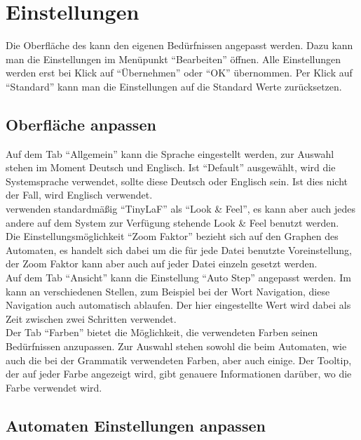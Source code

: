 \chapter{Einstellungen}

Die Oberfläche des \gtitools kann den eigenen Bedürfnissen angepasst werden.
Dazu kann man die Einstellungen im Menüpunkt "`Bearbeiten"' öffnen. Alle
Einstellungen werden erst bei Klick auf "`Übernehmen"' oder "`OK"' übernommen.
Per Klick auf "`Standard"' kann man die Einstellungen auf die Standard Werte
zurücksetzen.


\section{Oberfläche anpassen}

Auf dem Tab "`Allgemein"' kann die Sprache eingestellt werden, zur Auswahl
stehen im Moment Deutsch und Englisch. Ist "`Default"' ausgewählt, wird
die Systemsprache verwendet, sollte diese Deutsch oder Englisch sein. Ist dies
nicht der Fall, wird Englisch verwendet.\\
\gtitool verwenden standardmäßig "`TinyLaF"' als "`Look \& Feel"', es kann aber
auch jedes andere auf dem System zur Verfügung stehende Look \& Feel benutzt
werden.\\
Die Ein\-stell\-ungs\-möglich\-keit "`Zoom Faktor"' bezieht sich auf den Graphen 
des Automaten, es handelt sich dabei um die für jede Datei benutzte Voreinstellung,
der Zoom Faktor kann aber auch auf jeder Datei einzeln gesetzt werden.\\
Auf dem Tab "`Ansicht"' kann die Einstellung "`Auto Step"' angepasst werden. Im
\gtitool kann an verschiedenen Stellen, zum Beispiel bei der Wort Navigation, diese
Navigation auch automatisch ablaufen. Der hier eingestellte Wert wird dabei
als Zeit zwischen zwei Schritten verwendet.\\
Der Tab "`Farben"' bietet die Möglichkeit, die verwendeten Farben seinen
Be\-dürf\-nis\-sen anzupassen. Zur Auswahl stehen sowohl die beim Automaten, wie
auch die bei der Grammatik verwendeten Farben, aber auch einige. Der Tooltip,
der auf jeder Farbe angezeigt wird, gibt genauere Informationen darüber, wo
die Farbe verwendet wird.


\section{Automaten Einstellungen anpassen}

